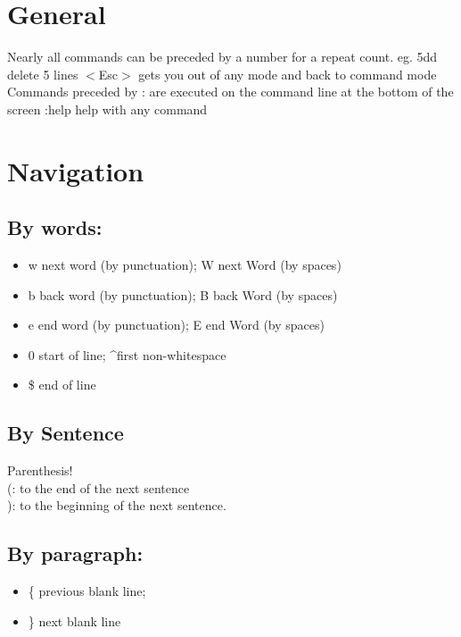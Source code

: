 \documentclass{article}
\begin{document}
\section{General}

    Nearly all commands can be preceded by a number for a repeat count. eg. 5dd delete 5 lines
    $<$Esc$>$ gets you out of any mode and back to command mode
    Commands preceded by : are executed on the command line at the bottom of the screen
    :help help with any command

\section{Navigation}

    \subsection{By words:}
        \begin{itemize}
        \item w next word (by punctuation); W next Word (by spaces)
        \item b back word (by punctuation); B back Word (by spaces)
        \item e end word (by punctuation); E end Word (by spaces)
        \end{itemize}
    \begin{itemize}
    \subsection{By line:}
        \item 0 start of line; \textasciicircum  first non-whitespace
        \item \$ end of line
        \end{itemize}
    \subsection{By Sentence}
    Parenthesis!\\
                (: to the end of the next sentence\\
                ): to the beginning of the next sentence.
        
    \subsection{By paragraph:}
        \begin{itemize}
        \item \{ previous blank line; 
        \item \} next blank line
        \end{itemize}
\end{document}

